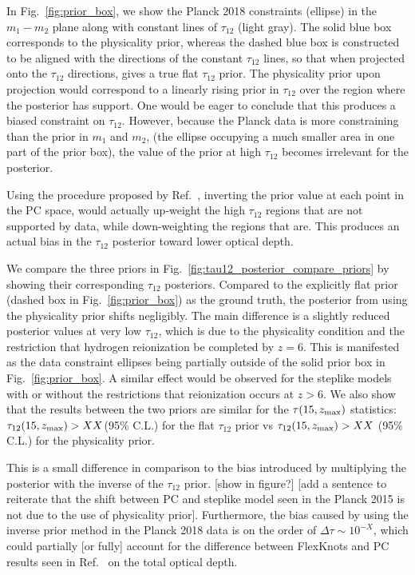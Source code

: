 \documentclass[prd,twocolumn,amsmath,amssymb,floatfix,superscriptaddress,nofootinbib]{revtex4-1}
\newcommand{\zmax}{z_{\rm max}}
\begin{document}
In Fig.~\ref{fig:prior_box}, we show the Planck 2018 constraints (ellipse) in the $m_1-m_2$ plane along with constant lines of $\tau_{12}$ (light gray). The solid blue box corresponds to the physicality prior, whereas the dashed blue box is constructed to be aligned with the directions of the constant $\tau_{12}$ lines, so that when projected onto the $\tau_{12}$ directions, gives a true flat $\tau_{12}$ prior. The physicality prior upon projection would correspond to a linearly rising prior in $\tau_{12}$ over the region where the posterior has support. One would be eager to conclude that this produces a biased constraint on $\tau_{12}$. However, because the Planck data is more constraining than the prior in $m_1$ and $m_2$, (the ellipse occupying a much smaller area in one part of the prior box), the value of the prior at high $\tau_{12}$ becomes irrelevant for the posterior.

Using the procedure proposed by Ref.~\cite{Millea:2018bko}, inverting the prior value at each point in the PC space, would actually up-weight the high $\tau_{12}$ regions that are not supported by data, while down-weighting the regions that are. This produces an actual bias in the $\tau_{12}$ posterior toward lower optical depth.

We compare the three priors in Fig.~\ref{fig:tau12_posterior_compare_priors} by showing their corresponding $\tau_{12}$ posteriors. Compared to the explicitly flat prior (dashed box in Fig.~\ref{fig:prior_box}) as the ground truth, the posterior from using the physicality prior shifts negligibly. The main difference is a slightly reduced posterior values at very low $\tau_{12}$, which is due to the physicality condition and the restriction that hydrogen reionization be completed by $z = 6$. This is manifested as the data constraint ellipses being partially outside of the solid prior box in Fig.~\ref{fig:prior_box}. A similar effect would be observed for the steplike models with or without the  restrictions that reionization occurs at $z>6$. We also show that the results between the two priors are similar for the $\tau(15, \zmax)$ statistics: $\tau_{12}(15, \zmax) > XX $(95\% C.L.) for the flat $\tau_{12}$ prior vs $\tau_{12}(15, \zmax) > XX $ (95\% C.L.) for the physicality prior.

This is a small difference in comparison to the bias introduced by multiplying the posterior with the inverse of the $\tau_{12}$ prior. [show in figure?] [add a sentence to reiterate that the shift between PC and steplike model seen in the Planck 2015 is not due to the use of physicality prior]. Furthermore, the bias caused by using the inverse prior method in the Planck 2018 data is on the order of $\Delta \tau \sim 10^{-X}$, which could partially [or fully] account for the difference between FlexKnots and PC results seen in Ref.~\cite{Aghanim:2018eyx} on the total optical depth. 
\end{document}
